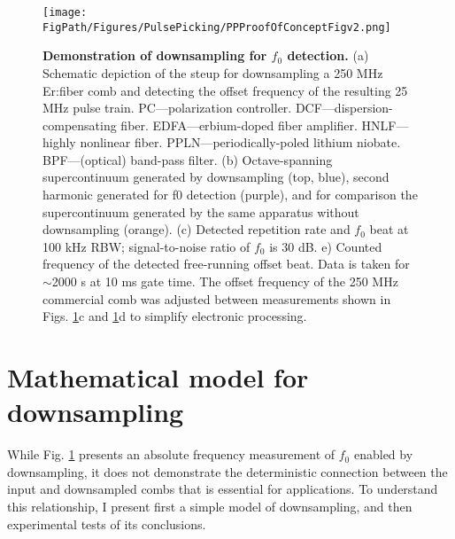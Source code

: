\begin{figure}[htpb]
	\begin{center}
		\texttt{[image: \\FigPath/Figures/PulsePicking/PPProofOfConceptFigv2.png]}
	\end{center}
	\caption[Demonstration of downsmapling for $f_0$ detection]{\textbf{Demonstration of downsampling for $f_0$ detection.} (a) Schematic depiction of the steup for downsampling a 250 MHz Er:fiber comb and detecting the offset frequency of the resulting 25 MHz pulse train. PC---polarization controller.  DCF---dispersion-compensating fiber. EDFA---erbium-doped fiber amplifier. HNLF---highly nonlinear fiber. PPLN---periodically-poled lithium niobate. BPF---(optical) band-pass filter. (b) Octave-spanning supercontinuum generated by downsampling (top, blue), second harmonic generated for f0 detection (purple), and for comparison the supercontinuum generated by the same apparatus without downsampling (orange). (c) Detected repetition rate and $f_0$ beat at 100 kHz RBW; signal-to-noise ratio of $f_0$ is 30 dB. e) Counted frequency of the detected free-running offset beat. Data is taken for $\sim$2000 s at 10 ms gate time. The offset frequency of the 250 MHz commercial comb was adjusted between measurements shown in Figs. \ref{fig:PPDemo}c and \ref{fig:PPDemo}d to simplify electronic processing.}
	\label{fig:PPDemo}
\end{figure} 



\section{Mathematical model for downsampling}\label{sec:PPMath}
While Fig. \ref{fig:PPDemo} presents an absolute frequency measurement of $f_0$ enabled by downsampling, it does not demonstrate the deterministic connection between the input and downsampled combs that is essential for applications. To understand this relationship, I present first a simple model of downsampling, and then experimental tests of its conclusions.

